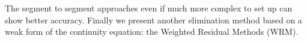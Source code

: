   The segment to segment approaches even if much more complex to set up can show better accuracy. Finally we present another elimination method based on a weak form of the continuity equation: the Weighted Residual Methods (WRM).


